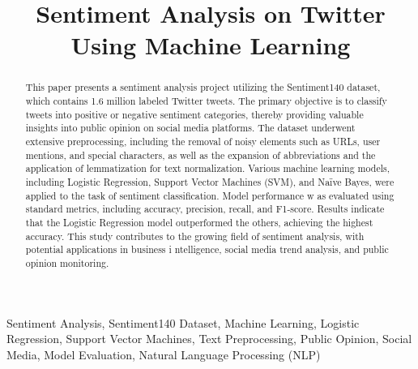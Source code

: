 \documentclass[conference]{IEEEtran}
\begin{document}
\title{Sentiment Analysis on Twitter Using Machine Learning\\
}

\author{
}

\maketitle

\begin{abstract}
This paper presents a sentiment analysis project utilizing the Sentiment140 dataset, which contains 1.6 million labeled Twitter tweets. 
The primary objective is to classify tweets into positive or negative sentiment categories, thereby providing valuable insights into public
 opinion on social media platforms. The dataset underwent extensive preprocessing, including the removal of noisy elements such as URLs, user mentions, 
 and special characters, as well as the expansion of abbreviations and the application of lemmatization for text normalization. Various machine learning models, 
 including Logistic Regression, Support Vector Machines (SVM), and Naïve Bayes, were applied to the task of sentiment classification. Model performance w
 as evaluated using standard metrics, including accuracy, precision, recall, and F1-score. Results indicate that the Logistic Regression model outperformed 
 the others, achieving the highest accuracy. This study contributes to the growing field of sentiment analysis, with potential applications in business i
 ntelligence, social media trend analysis, and public opinion monitoring.
\end{abstract}


\begin{IEEEkeywords}
        Sentiment Analysis, Sentiment140 Dataset, Machine Learning, Logistic Regression, Support Vector Machines, 
        Text Preprocessing, Public Opinion, Social Media, Model Evaluation, Natural Language Processing (NLP)
\end{IEEEkeywords}
\end{document}
